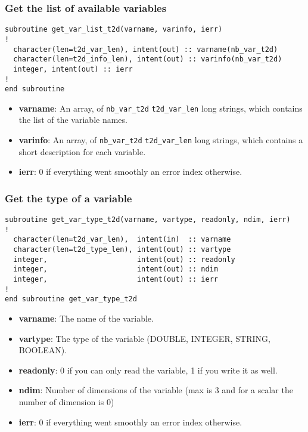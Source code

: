 \subsubsection{Get the list of available variables}
%
\begin{lstlisting}
subroutine get_var_list_t2d(varname, varinfo, ierr)
!
  character(len=t2d_var_len), intent(out) :: varname(nb_var_t2d)
  character(len=t2d_info_len), intent(out) :: varinfo(nb_var_t2d)
  integer, intent(out) :: ierr
!
end subroutine 
\end{lstlisting}
%
\begin{itemize}
\item \textbf{varname}: An array, of \verb!nb_var_t2d! \verb!t2d_var_len! long
strings, which contains the list of the variable names.
\item \textbf{varinfo}: An array, of \verb!nb_var_t2d! \verb!t2d_var_len! long
strings, which contains a short description for each variable.
\item \textbf{ierr}: 0 if everything went smoothly an error index otherwise.
\end{itemize}
%
\subsubsection{Get the type of a variable}
%
\begin{lstlisting}
subroutine get_var_type_t2d(varname, vartype, readonly, ndim, ierr)
!
  character(len=t2d_var_len),  intent(in)  :: varname
  character(len=t2d_type_len), intent(out) :: vartype
  integer,                     intent(out) :: readonly
  integer,                     intent(out) :: ndim
  integer,                     intent(out) :: ierr
!
end subroutine get_var_type_t2d
\end{lstlisting}
%
\begin{itemize}
\item \textbf{varname}: The name of the variable.
\item \textbf{vartype}: The type of the variable (DOUBLE, INTEGER, STRING,
BOOLEAN).
\item \textbf{readonly}: 0 if you can only read the variable, 1 if you write it
as well.
\item \textbf{ndim}: Number of dimensions of the variable (max is 3 and for a
scalar the number of dimension is 0)
\item \textbf{ierr}: 0 if everything went smoothly an error index otherwise.
\end{itemize}
%
